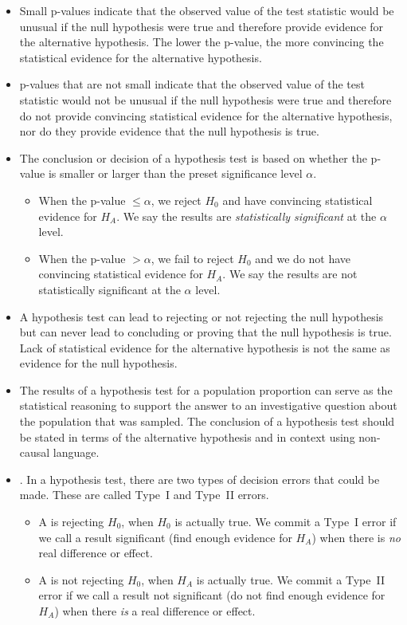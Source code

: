 \begin{itemize}
\item Small p-values indicate that the observed value of the test statistic would be
unusual if the null hypothesis were true and therefore provide evidence for
the alternative hypothesis. The lower the p-value, the more convincing the
statistical evidence for the alternative hypothesis.

\item p-values that are not small indicate that the observed value of the test statistic
would not be unusual if the null hypothesis were true and therefore do not
provide convincing statistical evidence for the alternative hypothesis, nor do
they provide evidence that the null hypothesis is true.



\item The conclusion or decision of a hypothesis test is based on whether the p-value is smaller or larger than the preset significance level $\alpha$. \vspace{-1mm}
\begin{itemize}
\item When the  p-value $\le \alpha$, we reject $H_0$ and have convincing statistical evidence for $H_A$.  We say the results are \emph{statistically significant} at the $\alpha$ level.
\item When the  p-value $> \alpha$, we fail to reject $H_0$ and we do not have convincing statistical evidence for $H_A$.  We say the results are not statistically significant at the $\alpha$ level. 
\end{itemize}

\item A hypothesis test can lead to rejecting or not rejecting the null hypothesis but
can never lead to concluding or proving that the null hypothesis is true. Lack of
statistical evidence for the alternative hypothesis is not the same as evidence
for the null hypothesis.

\item The results of a hypothesis test for a population proportion can serve as the
statistical reasoning to support the answer to an investigative question about
the population that was sampled. The conclusion of a hypothesis test should be stated in terms of the alternative hypothesis and in context using non-causal language.  


\item {}.  In a hypothesis test, there are two types of decision errors that could be made.  These are called Type~I and Type~II errors. \vspace{-1mm}
\begin{itemize}
\item A  is rejecting $H_0$, when $H_0$ is actually true.  We commit a Type~I error if we call a result significant (find enough evidence for $H_A$) when there is \emph{no} real difference or effect. 
\item A  is not rejecting $H_0$, when $H_A$ is actually true.  We commit a Type~II error if we call a result not significant (do not find enough evidence for $H_A$) when there \emph{is} a real difference or effect. 
\end{itemize}


\end{itemize}
